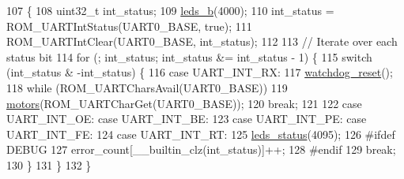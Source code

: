 \begin{DoxyCode}
107                 \{
108     uint32\_t int\_status;
109     \hyperlink{group__leds_ga8d3bb4e738e4b7b0ef8d2ec843158c1e}{leds\_b}(4000);
110     int\_status = ROM\_UARTIntStatus(UART0\_BASE, \textcolor{keyword}{true});
111     ROM\_UARTIntClear(UART0\_BASE, int\_status);
112     
113     \textcolor{comment}{// Iterate over each status bit}
114     \textcolor{keywordflow}{for} (; int\_status; int\_status &= int\_status - 1) \{
115         \textcolor{keywordflow}{switch} (int\_status & -int\_status) \{
116             \textcolor{keywordflow}{case} UART\_INT\_RX:
117             \hyperlink{group__watchdog_ga1fdcf7b3f0948400f710d14490e49528}{watchdog\_reset}();
118             \textcolor{keywordflow}{while} (ROM\_UARTCharsAvail(UART0\_BASE))
119                 \hyperlink{group__motors_ga2974c2cf5e3983d657ff575f24ed8854}{motors}(ROM\_UARTCharGet(UART0\_BASE));
120             \textcolor{keywordflow}{break};
121             
122             \textcolor{keywordflow}{case} UART\_INT\_OE: \textcolor{keywordflow}{case} UART\_INT\_BE:
123             \textcolor{keywordflow}{case} UART\_INT\_PE: \textcolor{keywordflow}{case} UART\_INT\_FE:
124             \textcolor{keywordflow}{case} UART\_INT\_RT:
125             \hyperlink{group__leds_ga960be609eb29a47eedea0f056e151f38}{leds\_status}(4095);
126 \textcolor{preprocessor}{#ifdef DEBUG}
127             error\_count[\_\_builtin\_clz(int\_status)]++;
128 \textcolor{preprocessor}{#endif}
129             \textcolor{keywordflow}{break};
130         \}
131     \}
132 \}
\end{DoxyCode}
